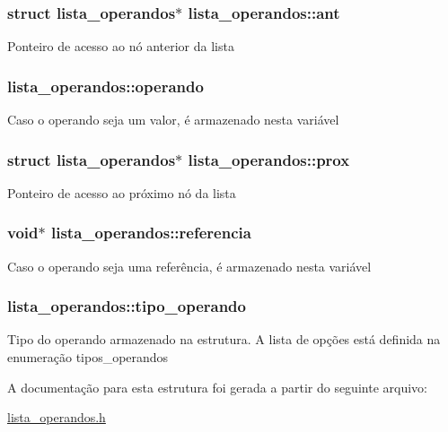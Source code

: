 \subsubsection[{\texorpdfstring{ant}{ant}}]{\setlength{\rightskip}{0pt plus 5cm}struct {\bf lista\+\_\+operandos}$\ast$ lista\+\_\+operandos\+::ant}\hypertarget{structlista__operandos_a23159c6dfeb873d67e8d51c312c551ee}{}\label{structlista__operandos_a23159c6dfeb873d67e8d51c312c551ee}
Ponteiro de acesso ao nó anterior da lista 
\subsubsection[{\texorpdfstring{operando}{operando}}]{ lista\+\_\+operandos\+::operando}\hypertarget{structlista__operandos_ab978dbacb8f42fd87f19cca8e804d121}{}\label{structlista__operandos_ab978dbacb8f42fd87f19cca8e804d121}
Caso o operando seja um valor, é armazenado nesta variável 
\subsubsection[{\texorpdfstring{prox}{prox}}]{\setlength{\rightskip}{0pt plus 5cm}struct {\bf lista\+\_\+operandos}$\ast$ lista\+\_\+operandos\+::prox}\hypertarget{structlista__operandos_a90699e5c7f710177b37754cd5231c9f5}{}\label{structlista__operandos_a90699e5c7f710177b37754cd5231c9f5}
Ponteiro de acesso ao próximo nó da lista 
\subsubsection[{\texorpdfstring{referencia}{referencia}}]{\setlength{\rightskip}{0pt plus 5cm}void$\ast$ lista\+\_\+operandos\+::referencia}\hypertarget{structlista__operandos_a5efba56f9f00715a8c9558292b851d37}{}\label{structlista__operandos_a5efba56f9f00715a8c9558292b851d37}
Caso o operando seja uma referência, é armazenado nesta variável 
\subsubsection[{\texorpdfstring{tipo\+\_\+operando}{tipo_operando}}]{ lista\+\_\+operandos\+::tipo\+\_\+operando}\hypertarget{structlista__operandos_af64bc84846f21a809f68b783f0e39f40}{}\label{structlista__operandos_af64bc84846f21a809f68b783f0e39f40}
Tipo do operando armazenado na estrutura. A lista de opções está definida na enumeração {\ttfamily tipos\+\_\+operandos} 

A documentação para esta estrutura foi gerada a partir do seguinte arquivo\+:\begin{DoxyCompactItemize}
\item 
\hyperlink{lista__operandos_8h}{lista\+\_\+operandos.\+h}\end{DoxyCompactItemize}
